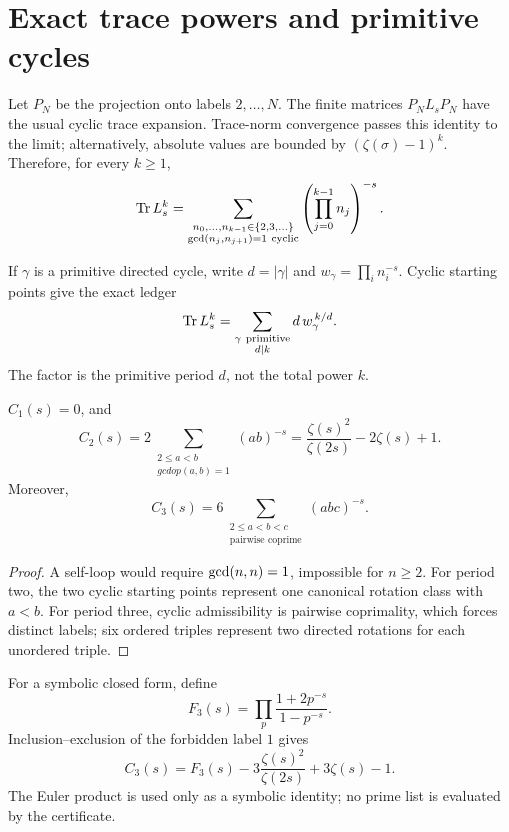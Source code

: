 \section{Exact trace powers and primitive cycles}

Let \(P_N\) be the projection onto labels \(2,\ldots,N\).  The finite matrices
\(P_NL_sP_N\) have the usual cyclic trace expansion.  Trace-norm convergence
passes this identity to the limit; alternatively, absolute values are bounded
by \((\zeta(\sigma)-1)^k\).  Therefore, for every \(k\geq1\),
\[
\operatorname{Tr} L_s^k
=\sum_{\substack{n_0,\ldots,n_{k-1}\in\{2,3,\ldots\}\\
\operatorname{gcd}(n_j,n_{j+1})=1\ {\rm cyclic}}}
\left(\prod_{j=0}^{k-1}n_j\right)^{-s}.
\]

If \(\gamma\) is a primitive directed cycle, write \(d=|\gamma|\) and
\(w_\gamma=\prod_i n_i^{-s}\).  Cyclic starting points give the exact ledger
\[
\operatorname{Tr} L_s^k
=\sum_{\substack{\gamma\ {\rm primitive}\\d\mid k}}
d\,w_\gamma^{\,k/d}.
\]
The factor is the primitive period \(d\), not the total power \(k\).

\begin{proposition}
\(C_1(s)=0\), and
\[
C_2(s)=2\sum_{\substack{2\leq a<b\\gcdop(a,b)=1}}(ab)^{-s}
=\frac{\zeta(s)^2}{\zeta(2s)}-2\zeta(s)+1.
\]
Moreover,
\[
C_3(s)=6\sum_{\substack{2\leq a<b<c\\
\text{pairwise coprime}}}(abc)^{-s}.
\]
\end{proposition}

\begin{proof}
A self-loop would require \(\operatorname{gcd}(n,n)=1\), impossible for \(n\geq2\).
For period two, the two cyclic starting points represent one canonical
rotation class with \(a<b\).  For period three, cyclic admissibility is
pairwise coprimality, which forces distinct labels; six ordered triples
represent two directed rotations for each unordered triple.
\end{proof}

For a symbolic closed form, define
\[
F_3(s)=\prod_p\frac{1+2p^{-s}}{1-p^{-s}}.
\]
Inclusion--exclusion of the forbidden label \(1\) gives
\[
C_3(s)=F_3(s)-3\frac{\zeta(s)^2}{\zeta(2s)}
+3\zeta(s)-1.
\]
The Euler product is used only as a symbolic identity; no prime list is
evaluated by the certificate.

